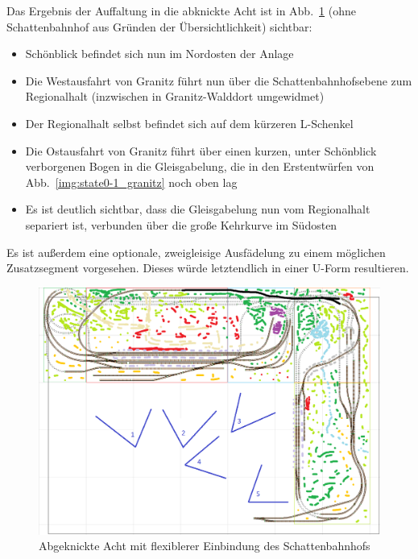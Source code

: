 Das Ergebnis der Auffaltung in die abknickte Acht ist in Abb.~\ref{img:state2_granitz_modules_details} (ohne Schattenbahnhof aus Gr\"unden der \"Ubersichtlichkeit) sichtbar:
\begin{itemize}
	\item Sch\"onblick befindet sich nun im Nordosten der Anlage
	\item Die Westausfahrt von Granitz f\"uhrt nun \"uber die Schattenbahnhofsebene zum Regionalhalt (inzwischen in Granitz-Walddort umgewidmet)
	\item Der Regionalhalt selbst befindet sich auf dem k\"urzeren L-Schenkel
	\item Die Ostausfahrt von Granitz f\"uhrt \"uber einen kurzen, unter Sch\"onblick verborgenen Bogen in die Gleisgabelung, die in den Erstentw\"urfen von Abb.~\ref{img:state0-1_granitz} noch oben lag
	\item Es ist deutlich sichtbar, dass die Gleisgabelung nun vom Regionalhalt separiert ist, verbunden \"uber die gro{\ss}e Kehrkurve im S\"udosten
\end{itemize}

Es ist au{\ss}erdem eine optionale, zweigleisige Ausf\"adelung zu einem m\"oglichen Zusatzsegment vorgesehen.
Dieses w\"urde letztendlich in einer U-Form resultieren.

\begin{figure}[h]
\centering
  \includegraphics[width=1.0\textwidth]{img/map_evolution/state2_granitz_modules_details.png}
	\caption{Abgeknickte Acht mit flexiblerer Einbindung des Schattenbahnhofs}
	\label{img:state2_granitz_modules_details}
\end{figure}

